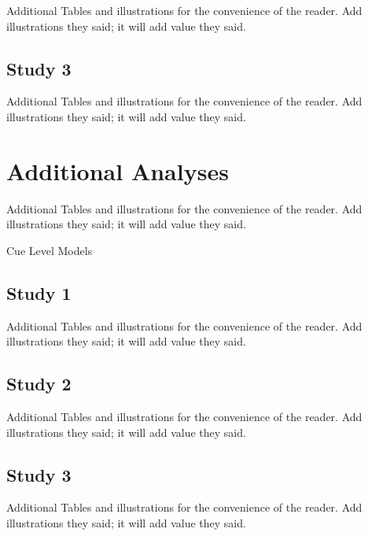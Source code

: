 \documentclass[
  man]{apa6}
\begin{document}
Additional Tables and illustrations for the convenience of the reader. Add illustrations they said; it will add value they said.

\subsection{Study 3}\label{study-3-2}

Additional Tables and illustrations for the convenience of the reader. Add illustrations they said; it will add value they said.

\section{Additional Analyses}\label{additional-analyses-1}

Additional Tables and illustrations for the convenience of the reader. Add illustrations they said; it will add value they said.

Cue Level Models

\subsection{Study 1}\label{study-1-3}

Additional Tables and illustrations for the convenience of the reader. Add illustrations they said; it will add value they said.

\subsection{Study 2}\label{study-2-3}

Additional Tables and illustrations for the convenience of the reader. Add illustrations they said; it will add value they said.

\subsection{Study 3}\label{study-3-3}

Additional Tables and illustrations for the convenience of the reader. Add illustrations they said; it will add value they said.
\end{document}
